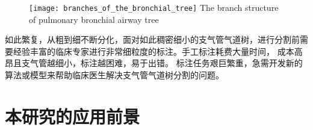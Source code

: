 \begin{figure}[!htp]
	\centering
	\texttt{[image: branches\_of\_the\_bronchial\_tree]}
		{The branch structure of pulmonary bronchial airway tree}
	\label{fig:branches_of_bronchial_tree}	
\end{figure}

如此繁复，从粗到细不断分化，面对如此稠密细小的支气管气道树，进行分割前需要经验丰富的临床专家进行非常细粒度的标注。手工标注耗费大量时间，
成本高昂且支气管越细小，标注越困难，易于出错。 标注任务艰巨繁重，急需开发新的算法或模型来帮助临床医生解决支气管气道树分割的问题。

\section{本研究的应用前景}\label{sec:application_prospect}

